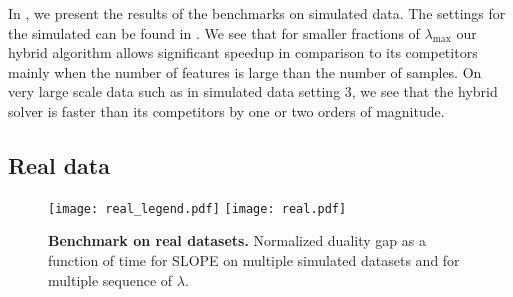 In , we present the results of the benchmarks on simulated data.
The settings for the simulated can be found in .
We see that for smaller fractions of $\lambda_{\text{max}}$ our hybrid algorithm allows significant speedup in comparison to its competitors mainly when the number of features is large than the number of samples.
On very large scale data such as in simulated data setting $3$, we see that the hybrid solver is faster than its competitors by one or two orders of magnitude.


\subsection{Real data}
\begin{figure*}[htb]
  \centering
  \texttt{[image: real\_legend.pdf]}
  \texttt{[image: real.pdf]}
  \caption{\textbf{Benchmark on real datasets.} Normalized duality gap as a function of time for SLOPE on multiple simulated datasets and for multiple sequence of $\lambda$.}
  \label{fig:real}
\end{figure*}
